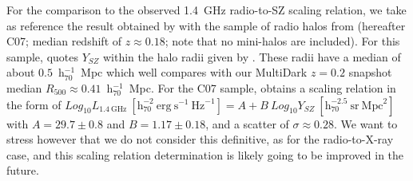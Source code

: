 \documentclass[traditabstract]{aa}
\newcommand{\rmn}{\mathrm}
\begin{document}
For the comparison to the observed 1.4~GHz radio-to-SZ scaling relation, we take as reference the result obtained by \cite{2012MNRAS.421L.112B} with the sample of radio halos from \cite{2007MNRAS.378.1565C} (hereafter C07; median redshift of $z \approx 0.18$; note that no mini-halos are included). For this sample, \cite{2012MNRAS.421L.112B} quotes $Y_{SZ}$ within the halo radii given by \cite{2007MNRAS.378.1565C}. These radii have a median of about $0.5$~h$_{70}^{-1}$~Mpc which well compares with our MultiDark $z = 0.2$ snapshot median $R_{500} \approx 0.41$~h$_{70}^{-1}$~Mpc. For the C07 sample, \cite{2012MNRAS.421L.112B} obtains a scaling relation in the form of  $Log_{10} L_{1.4~\rmn{GHz}}~[\rmn{h}_{70}^{-2}~\rmn{erg}~\rmn{s}^{-1}~\rmn{Hz}^{-1}] = A + B~Log_{10} Y_{SZ}~[\rmn{h}_{70}^{-2.5}~\rmn{sr}~\rmn{Mpc}^{2}]$ with $A=29.7\pm0.8$ and $B=1.17\pm0.18$, and a scatter of $\sigma \approx 0.28$. We want to stress however that we do not consider this definitive, as for the radio-to-X-ray case, and this scaling relation determination is likely going to be improved in the future. 
\end{document}
